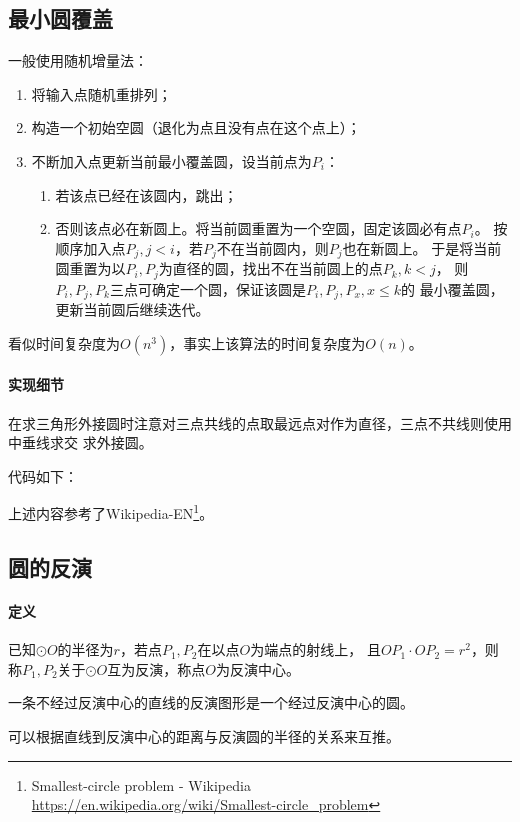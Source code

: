\subsection{最小圆覆盖}
一般使用随机增量法：
\begin{enumerate}
	\item 将输入点随机重排列；
	\item 构造一个初始空圆（退化为点且没有点在这个点上）；
	\item 不断加入点更新当前最小覆盖圆，设当前点为$P_i$：
	\begin{enumerate}
		\item 若该点已经在该圆内，跳出；
		\item 否则该点必在新圆上。将当前圆重置为一个空圆，固定该圆必有点$P_i$。
		按顺序加入点$P_j,j<i$，若$P_j$不在当前圆内，则$P_j$也在新圆上。
		于是将当前圆重置为以$P_i,P_j$为直径的圆，找出不在当前圆上的点$P_k,k<j$，
		则$P_i,P_j,P_k$三点可确定一个圆，保证该圆是$P_i,P_j,P_x,x\leq k$的
		最小覆盖圆，更新当前圆后继续迭代。
	\end{enumerate}
\end{enumerate}

看似时间复杂度为$O(n^3)$，事实上该算法的时间复杂度为$O(n)$。

\paragraph{实现细节}
在求三角形外接圆时注意对三点共线的点取最远点对作为直径，三点不共线则使用中垂线求交
求外接圆。

代码如下：


上述内容参考了Wikipedia-EN\footnote{
	Smallest-circle problem - Wikipedia\\
	\url{https://en.wikipedia.org/wiki/Smallest-circle\_problem}
}。
\subsection{圆的反演}
\paragraph{定义} 已知$\odot O$的半径为$r$，若点$P_1,P_2$在以点$O$为端点的射线上，
且$OP_1\cdot OP_2=r^2$，则称$P_1,P_2$关于$\odot O$互为反演，称点$O$为反演中心。

\begin{property}
	一条不经过反演中心的直线的反演图形是一个经过反演中心的圆。
\end{property}
可以根据直线到反演中心的距离与反演圆的半径的关系来互推。

